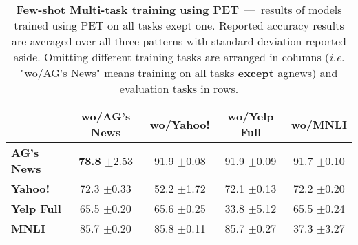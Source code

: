 \begin{table}[b]
	\fontsize{7}{10}
	\selectfont
	\begin{tabular*}{\columnwidth}{l@{\extracolsep{\fill}}cccc}
		\toprule
		& \textbf{wo/AG's News} & \textbf{wo/Yahoo!} & \textbf{wo/Yelp Full} & \textbf{wo/MNLI} \\
		\hline
		\textbf{AG's News}    & \textbf{78.8} \tiny$\pm$2.53        & 91.9 \tiny$\pm$0.08        & 91.9   \tiny$\pm$0.09          & 91.7 \tiny$\pm$0.10       \\
		\textbf{Yahoo!}     & 72.3 \tiny$\pm$0.33        & 52.2 \tiny$\pm$1.72        & 72.1   \tiny$\pm$0.13          & 72.2 \tiny$\pm$0.20       \\
		\textbf{Yelp Full} & 65.5 \tiny$\pm$0.20        & 65.6 \tiny$\pm$0.25        & 33.8   \tiny$\pm$5.12          & 65.5 \tiny$\pm$0.24       \\
		\textbf{MNLI}      & 85.7 \tiny$\pm$0.20        & 85.8 \tiny$\pm$0.11        & 85.7   \tiny$\pm$0.27          & 37.3 \tiny$\pm$3.27       \\
		\bottomrule
	\end{tabular*}
	\caption{\textbf{Few-shot Multi-task training using PET}~---~results of models trained using PET on all tasks exept one. Reported accuracy results are averaged over all three patterns with standard deviation reported aside. Omitting different training tasks are arranged in columns (\textit{i.e.} "wo/AG's News" means training on all tasks \textbf{except} agnews) and evaluation tasks in rows.}\label{tab:multi-use-logits-summary}
	\vspace{-4mm}
\end{table}
